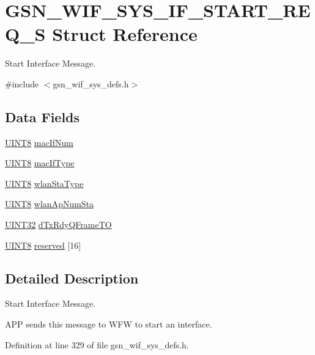 \hypertarget{a00353}{
\section{GSN\_\-WIF\_\-SYS\_\-IF\_\-START\_\-REQ\_\-S Struct Reference}
\label{a00353}
}


Start Interface Message.  




{\ttfamily \#include $<$gsn\_\-wif\_\-sys\_\-defs.h$>$}

\subsection*{Data Fields}
\begin{DoxyCompactItemize}
\item 
\hyperlink{a00660_gab27e9918b538ce9d8ca692479b375b6a}{UINT8} \hyperlink{a00353_ae57ae92e651751e7978e237c55133b4c}{macIfNum}
\item 
\hyperlink{a00660_gab27e9918b538ce9d8ca692479b375b6a}{UINT8} \hyperlink{a00353_ae22f1eeffa8ecf759f18f577db286c8d}{macIfType}
\item 
\hyperlink{a00660_gab27e9918b538ce9d8ca692479b375b6a}{UINT8} \hyperlink{a00353_a99a9e67e9bebdcb1824766965c98af8f}{wlanStaType}
\item 
\hyperlink{a00660_gab27e9918b538ce9d8ca692479b375b6a}{UINT8} \hyperlink{a00353_aaade074f9f5d2a057d4c1c1a98b1dc5d}{wlanApNumSta}
\item 
\hyperlink{a00660_gae1e6edbbc26d6fbc71a90190d0266018}{UINT32} \hyperlink{a00353_ae8f42a0ee7b57763cd16c0ee167535d6}{dTxRdyQFrameTO}
\item 
\hyperlink{a00660_gab27e9918b538ce9d8ca692479b375b6a}{UINT8} \hyperlink{a00353_ab6636d92a45a0b1933fe21f421453f22}{reserved} \mbox{[}16\mbox{]}
\end{DoxyCompactItemize}


\subsection{Detailed Description}
Start Interface Message. 

APP sends this message to WFW to start an interface. 

Definition at line 329 of file gsn\_\-wif\_\-sys\_\-defs.h.



